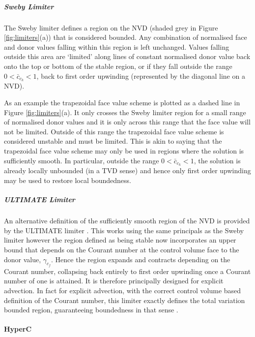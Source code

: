\subparagraph{Sweby Limiter}

The Sweby limiter \citep{sweby_high_1984} defines a region on the NVD (shaded grey in Figure \ref{fig:limiters}(a)) that is considered bounded.  Any combination of normalised face and donor values falling within this region is left unchanged.  Values falling outside this area are `limited' along lines of constant normalised donor value back onto the top or bottom of the stable region, or if they fall outside the range $0<\bar{c}_{c_k}<1$, back to first order upwinding (represented by the diagonal line on a NVD).

As an example the trapezoidal face value scheme is plotted as a dashed line in Figure \ref{fig:limiters}(a).  It only crosses the Sweby limiter region for a small range of normalised donor values and it is only across this range that the face value will not be limited.  Outside of this range the trapezoidal face value scheme is considered unstable and must be limited.  This is akin to saying that the trapezoidal face value scheme may only be used in regions where the solution is sufficiently smooth.  In particular, outside the range $0<\bar{c}_{c_k}<1$, the solution is already locally unbounded (in a TVD sense) and hence only first order upwinding may be used to restore local boundedness.

\subparagraph{ULTIMATE Limiter}

An alternative definition of the sufficiently smooth region of the NVD is provided by the ULTIMATE limiter \citep[see Figure \ref{fig:limiters}(b), ][]{leonard_ultimate_1991}.  This works using the same principals as the Sweby limiter however the region defined as being stable now incorporates an upper bound that depends on the Courant number at the control volume face to the donor value, $\gamma_{c_f}$.  Hence the region expands and contracts depending on the Courant number, collapsing back entirely to first order upwinding once a Courant number of one is attained.  It is therefore principally designed for explicit advection.  In fact for explicit advection, with the correct control volume based definition of the Courant number, this limiter exactly defines the total variation bounded region, guaranteeing boundedness in that sense \citep{leonard_ultimate_1991, desprs_contact_2001}.

\paragraph{HyperC}

